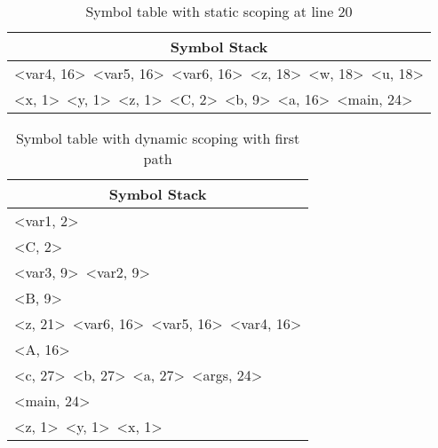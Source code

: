 \documentclass{article}
\begin{document}
\begin{table}[hp]
\begin{center}
\begin{tabular}{l}
\toprule
\multicolumn{1}{c}{Symbol Stack}\\
\midrule
\textless var4, 16\textgreater\ \textless var5, 16\textgreater\ \textless var6, 16\textgreater\ \textless z, 18\textgreater\ \textless w, 18\textgreater\ \textless u, 18\textgreater \\
\textless x, 1\textgreater\ \textless y, 1\textgreater\ \textless z, 1\textgreater\ \textless C, 2\textgreater\ \textless b, 9\textgreater\ \textless a, 16\textgreater\ \textless main, 24\textgreater\\
\bottomrule
\end{tabular}
\caption{Symbol table with static scoping at line 20}
\end{center}
\end{table}

\begin{table}[hp]
\begin{center}
\begin{tabular}{l}
\toprule
\multicolumn{1}{c}{Symbol Stack}\\
\midrule
\textless var1, 2\textgreater \\
\textless C, 2\textgreater \\
\textless var3, 9\textgreater\ \textless var2, 9\textgreater \\
\textless B, 9\textgreater \\
\textless z, 21\textgreater\ \textless var6, 16\textgreater\ \textless var5, 16\textgreater\ \textless var4, 16\textgreater \\
\textless A, 16\textgreater \\
\textless c, 27\textgreater\ \textless b, 27\textgreater\ \textless a, 27\textgreater\ \textless args, 24\textgreater \\
\textless main, 24\textgreater \\
\textless z, 1\textgreater\ \textless y, 1\textgreater\ \textless x, 1\textgreater \\
\bottomrule
\end{tabular}
\caption{Symbol table with dynamic scoping with first path}
\end{center}
\end{table}
\end{document}
